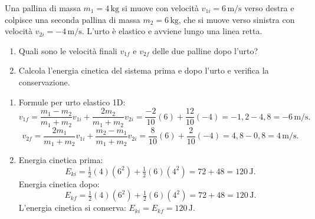 
\begin{question}[ID=2.1, subtitle={Velocità finali in un urto elastico 1D}, tags={urti elastici, energia cinetica}, difficulty=facile]
Una pallina di massa \(m_1 = 4 \, \text{kg}\) si muove con velocità \(v_{1i} = 6 \, \text{m/s}\) verso destra e colpisce una seconda pallina di massa \(m_2 = 6 \, \text{kg}\), che si muove verso sinistra con velocità \(v_{2i} = -4 \, \text{m/s}\). L'urto è elastico e avviene lungo una linea retta.
\begin{enumerate}
    \item Quali sono le velocità finali \(v_{1f}\) e \(v_{2f}\) delle due palline dopo l'urto?
    \item Calcola l'energia cinetica del sistema prima e dopo l'urto e verifica la conservazione.
\end{enumerate}
\begin{solution}
    \begin{enumerate}
        \item Formule per urto elastico 1D:
        \[
            v_{1f} = \frac{m_1 - m_2}{m_1 + m_2}v_{1i} + \frac{2m_2}{m_1+m_2}v_{2i}
            = \frac{-2}{10}(6) + \frac{12}{10}(-4) = -1{,}2 - 4{,}8 = -6 \, \text{m/s}.
        \]
        \[
            v_{2f} = \frac{2m_1}{m_1+m_2}v_{1i} + \frac{m_2 - m_1}{m_1+m_2}v_{2i}
            = \frac{8}{10}(6) + \frac{2}{10}(-4) = 4{,}8 - 0{,}8 = 4 \, \text{m/s}.
        \]
        \item Energia cinetica prima:
        \[
            E_{ki} = \tfrac{1}{2}(4)(6^2) + \tfrac{1}{2}(6)(4^2) = 72 + 48 = 120 \, \text{J}.
        \]
        Energia cinetica dopo:
        \[
            E_{kf} = \tfrac{1}{2}(4)(6^2) + \tfrac{1}{2}(6)(4^2) = 72 + 48 = 120 \, \text{J}.
        \]
        L'energia cinetica si conserva: \(E_{ki} = E_{kf} = 120 \, \text{J}\). \checkmark
    \end{enumerate}
\end{solution}
\end{question}


